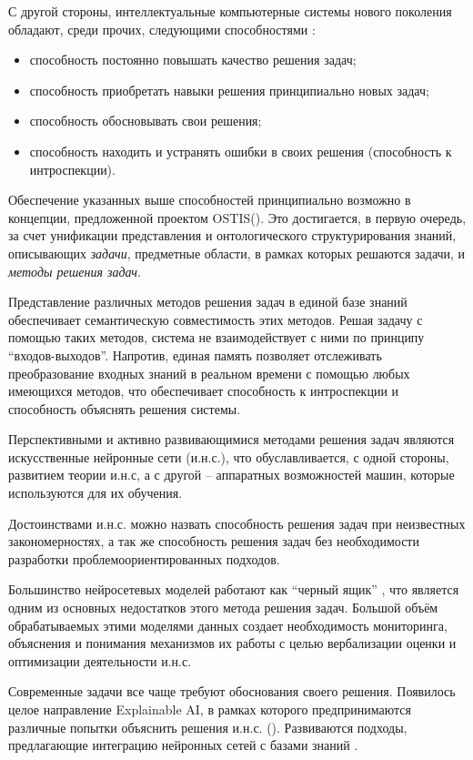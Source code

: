 С другой стороны, интеллектуальные компьютерные системы нового поколения обладают, среди прочих, следующими способностями \cite{Standard2021}:
\begin{itemize}
	\item способность постоянно повышать качество решения задач;
	\item способность приобретать навыки решения принципиально новых задач;
	\item способность обосновывать свои решения;
	\item способность находить и устранять ошибки в своих решения (способность к интроспекции).
\end{itemize}

Обеспечение указанных выше способностей принципиально возможно в концепции, предложенной проектом OSTIS(\cite{Standard2021}). Это достигается, в первую очередь, за счет унификации представления и онтологического структурирования знаний, описывающих \textit{задачи}, предметные области, в рамках которых решаются задачи, и \textit{методы решения задач}. 

Представление различных методов решения задач в единой базе знаний обеспечивает семантическую совместимость этих методов. Решая задачу с помощью таких методов, система не взаимодействует с ними по принципу ``входов-выходов''. Напротив, единая память позволяет отслеживать преобразование входных знаний в реальном времени с помощью любых имеющихся методов, что обеспечивает способность к интроспекции и способность объяснять решения системы.

Перспективными и активно развивающимися методами решения задач являются искусственные нейронные сети (и.н.с.), что обуславливается, с одной стороны, развитием теории и.н.с, а с другой -- аппаратных возможностей машин, которые используются для их обучения.

Достоинствами и.н.с. можно назвать способность решения задач при неизвестных закономерностях, а так же способность решения задач без необходимости разработки проблемоориентированных подходов. 

Большинство нейросетевых моделей работают как ``черный ящик'' \cite{gastelvecchi2016}, что является одним из основных недостатков этого метода решения задач. Большой объём обрабатываемых этими моделями данных создает необходимость мониторинга, объяснения и понимания механизмов их работы с целью вербализации оценки и оптимизации деятельности и.н.с.

Современные задачи все чаще требуют обоснования своего решения. Появилось целое направление Explainable AI, в рамках которого предпринимаются различные попытки объяснить решения и.н.с. (\cite{lime, shap}). Развиваются подходы, предлагающие интеграцию нейронных сетей с базами знаний \cite{nesy1, nesy2, nesy3}.

